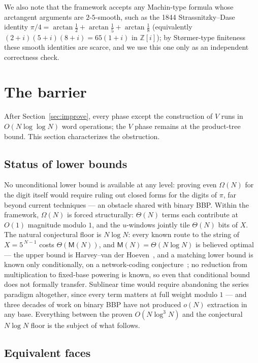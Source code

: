 \documentclass[11pt]{article}
\theoremstyle{remark}
\theoremstyle{definition}
\newcommand{\M}{\mathsf{M}}
\begin{document}
We also note that the framework accepts any Machin-type formula whose
arctangent arguments are $2$-$5$-smooth, such as the 1844
Strassnitzky--Dase identity
$\pi/4=\arctan\frac12+\arctan\frac15+\arctan\frac18$
(equivalently $(2+i)(5+i)(8+i)=65(1+i)$ in $\mathbb{Z}[i]$); by
St{\o}rmer-type finiteness these smooth identities are scarce, and we use
this one only as an independent correctness check.

\section{The barrier}\label{sec:barrier}

After Section~\ref{sec:improve}, every phase except the construction of
$V$ runs in $O(N\log\log N)$ word operations; the $V$ phase remains at the
product-tree bound. This section characterizes the obstruction.

\subsection{Status of lower bounds}

No unconditional lower bound is available at any level: proving even
$\Omega(N)$ for the digit itself would require ruling out closed forms for
the digits of $\pi$, far beyond current techniques --- an obstacle shared
with binary BBP. Within the framework, $\Omega(N)$ is forced structurally:
$\Theta(N)$ terms each contribute at $O(1)$ magnitude modulo $1$, and the
$u$-windows jointly tile $\Theta(N)$ bits of $X$. The natural conjectural
floor is $N\log N$: every known route to the string of $X=5^{\,N-1}$ costs
$\Theta(\M(N))$, and $\M(N)=\Theta(N\log N)$ is believed optimal --- the
upper bound is Harvey--van der Hoeven~\cite{HvdH21}, and a matching lower
bound is known only conditionally, on a network-coding
conjecture~\cite{AFKL19}; no reduction from multiplication to fixed-base
powering is known, so even that conditional bound does not formally
transfer. Sublinear time would require abandoning the series paradigm
altogether, since every term matters at full weight modulo $1$ --- and
three decades of work on binary BBP have not produced $o(N)$ extraction in
any base. Everything between the proven $O(N\log^{3}N)$ and the
conjectural $N\log N$ floor is the subject of what follows.

\subsection{Equivalent faces}
\end{document}
